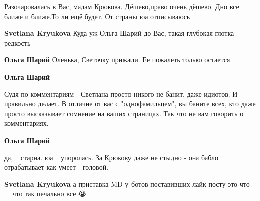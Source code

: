 \begin{itemize}
\begin{itemize}
Разочаровалась в Вас, мадам Крюкова. Дёшево,право очень дёшево. Дно все ближе и ближе.То ли ещё будет. От страны юа отписываюсь

 
\textbf{Svetlana Kryukova} Куда уж Ольга Шарий до Вас, такая глубокая глотка - редкость 🤣

 
\textbf{Ольга Шарий} Оленька, Светочку прижали. Ее пожалеть только остается

 
\textbf{Ольга Шарий} 

Судя по комментариям - Светлана просто никого не банит, даже идиотов. И
правильно делает. В отличие от вас с "однофамильцем", вы баните всех, кто даже
просто высказывает сомнение на ваших страницах. Так что не вам говорить о
комментариях.


 
\textbf{Ольга Шарий} 

да, =старна. юа= упоролась. За Крюкову даже не стыдно - она бабло отрабатывает
как умеет - головой.

 
\textbf{Svetlana Kryukova} а приставка MD у ботов поставивших лайк посту это что 🤣🤣🤣🤣🤣 что так печально все 😭🤣

 


\end{itemize}
\end{itemize}
